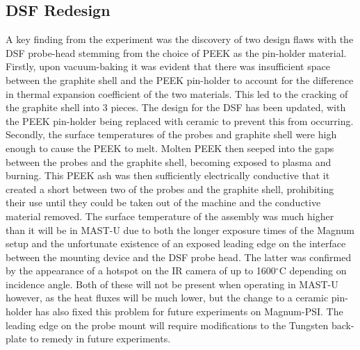 \documentclass[a4paper, 11pt]{article} %
\begin{document}
\subsection{DSF Redesign}
%
	A key finding from the experiment was the discovery of two design flaws with the DSF probe-head stemming from the choice of PEEK as the pin-holder material.
	Firstly, upon vacuum-baking it was evident that there was insufficient space between the graphite shell and the PEEK pin-holder to account for the difference in thermal expansion coefficient of the two materials.
	This led to the cracking of the graphite shell into 3 pieces.
	The design for the DSF has been updated, with the PEEK pin-holder being replaced with ceramic to prevent this from occurring.
	Secondly, the surface temperatures of the probes and graphite shell were high enough to cause the PEEK to melt.
	Molten PEEK then seeped into the gaps between the probes and the graphite shell, becoming exposed to plasma and burning. 
	This PEEK ash was then sufficiently electrically conductive that it created a short between two of the probes and the graphite shell, prohibiting their use until they could be taken out of the machine and the conductive material removed.
	The surface temperature of the assembly was much higher than it will be in MAST-U due to both the longer exposure times of the Magnum setup and the unfortunate existence of an exposed leading edge on the interface between the mounting device and the DSF probe head. 
	The latter was confirmed by the appearance of a hotspot on the IR camera of up to 1600$^{\circ}$C depending on incidence angle.
	Both of these will not be present when operating in MAST-U however, as the heat fluxes will be much lower, but the change to a ceramic pin-holder has also fixed this problem for future experiments on Magnum-PSI. 
	The leading edge on the probe mount will require modifications to the Tungsten back-plate to remedy in future experiments.
\end{document}
